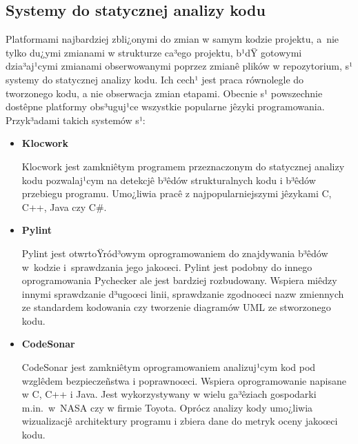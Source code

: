 \subsection{Systemy do statycznej analizy kodu}

Platformami najbardziej zbli¿onymi do zmian w samym kodzie projektu, a~nie tylko du¿ymi zmianami w
strukturze ca³ego projektu, b¹dŸ gotowymi dzia³aj¹cymi zmianami obserwowanymi poprzez zmianê plików w 
repozytorium, s¹ systemy do statycznej analizy kodu. Ich cech¹ jest praca równolegle do tworzonego kodu, a 
nie obserwacja zmian etapami. Obecnie s¹ powszechnie dostêpne platformy obs³uguj¹ce wszystkie popularne 
jêzyki programowania. Przyk³adami takich systemów s¹:

\begin{itemize}
	\item \textbf{Klocwork}
	
	Klocwork \cite{website:klocwork} jest zamkniêtym programem przeznaczonym do statycznej analizy kodu pozwalaj¹cym na detekcjê
	b³êdów strukturalnych kodu i b³êdów przebiegu programu. Umo¿liwia pracê z najpopularniejszymi jêzykami
	C, C++, Java czy C\#.
		 
	\item \textbf{Pylint}
	
	Pylint \cite{website:pylint} jest otwrtoŸród³owym oprogramowaniem do znajdywania b³êdów w~kodzie i~sprawdzania jego jakoœci.
	Pylint jest podobny do innego oprogramowania Pychecker ale jest bardziej rozbudowany. Wspiera miêdzy
	innymi sprawdzanie d³ugoœci linii, sprawdzanie zgodnoœci nazw zmiennych ze standardem kodowania czy 
	tworzenie diagramów UML ze stworzonego kodu.
	
	\item \textbf{CodeSonar}
	
	CodeSonar \cite{website:codesonar} jest zamkniêtym oprogramowaniem analizuj¹cym kod pod wzglêdem bezpieczeñstwa i poprawnoœci.
	Wspiera oprogramowanie napisane w C, C++ i Java. Jest wykorzystywany w wielu ga³êziach gospodarki
	m.in.~w~NASA czy w firmie Toyota. Oprócz analizy kody umo¿liwia wizualizacjê architektury programu i
	zbiera dane do metryk oceny jakoœci kodu.
	
\end{itemize}


